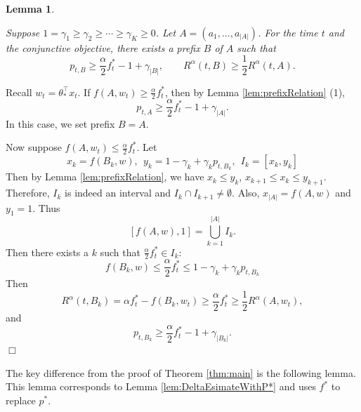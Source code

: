 \documentclass{article}
\newcommand{\abs}[1]{\left| #1 \right|}
\newtheorem{lemma}[theorem]{Lemma}%
\newenvironment{proof}{\noindent {\textbf{Proof. }}}{$\Box$ \medskip}
\newcommand{\CLemmaPrefixExi}{
	Suppose $1 = \gamma_1 \geq \gamma_2 \geq \cdots \geq \gamma_K \geq 0$. Let $A = (a_1, ..., a_{\abs{A}})$. For the time $t$ and the conjunctive objective, there exists a prefix $B$ of $A$ such that 
	$$
	p_{t, B} \geq \frac{\alpha}{2}f_{t}^{\ast} - 1 + \gamma_{\abs{B}}, \qquad R^{\alpha}(t, B) \geq \frac{1}{2} R^{\alpha}(t, A).
	$$ 
}
\begin{document}
\begin{lemma} %
	\label{lem:prefixexists}
	\CLemmaPrefixExi
\end{lemma}
\begin{proof}
	Recall $w_t = \theta_*^{\top} x_t$. If $f(A, w_t) \geq \frac{\alpha}{2} f_{t}^{\ast}$, then by Lemma \ref{lem:prefixRelation} (1),
	$$
	p_{t, A} \geq \frac{\alpha}{2} f_{t}^{\ast} - 1 + \gamma_{\abs{A}}.
	$$
	In this case, we set prefix $B = A$.
	
	Now suppose $f(A, w_t) \leq \frac{\alpha}{2} f_{t}^{\ast}$. Let
	$$
	x_k = f(B_k,w), ~~ y_k = 1 - \gamma_k + \gamma_k p_{t,B_k}, ~~I_k = [x_k, y_k]
	$$
	Then by Lemma \ref{lem:prefixRelation}, we have $x_k \leq y_k$, $x_{k+1} \leq x_k \leq y_{k+1}$. Therefore, $I_k$ is indeed an interval and $I_k \cap I_{k+1} \neq \emptyset$. Also, $x_{\abs{A}} = f(A, w)$ and $y_1 = 1$. Thus
	$$
	[f(A,w), 1] = \bigcup_{k=1}^{\abs{A}} I_k.
	$$
	Then there exists a $k$ such that $\frac{\alpha}{2}f_{t}^{\ast} \in I_k$:
	$$
	f(B_k,w) \leq \frac{\alpha}{2}f_{t}^{\ast} \leq 1 - \gamma_k + \gamma_k p_{t, B_k}
	$$
	Then 
	$$
	R^{\alpha}(t,B_k) = \alpha f_t^* - f(B_k, w_t) \geq \frac{\alpha}{2}f_t^* \geq \frac{1}{2} R^{\alpha}(A, w_t),
	$$
	and
	$$
	p_{t, B_k} \geq \frac{\alpha}{2}f_t^* - 1 + \gamma_{|B_k|}.
	$$
\end{proof}

The key difference from the proof of Theorem \ref{thm:main} is the following lemma. This lemma corresponds to Lemma \ref{lem:DeltaEsimateWithP*} and uses $f^{\ast}$ to replace $p^{\ast}$.
\end{document}
